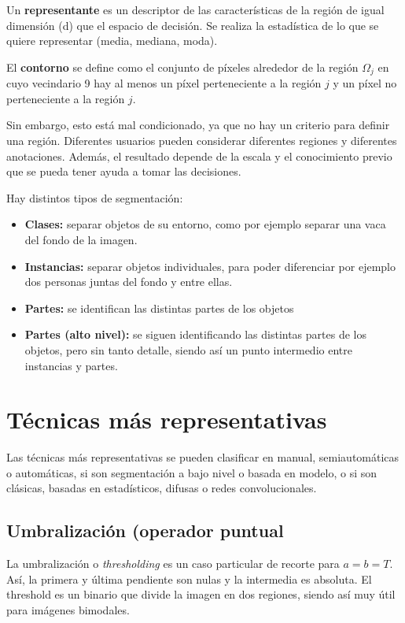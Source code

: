 Un \textbf{representante} es un descriptor de las características de la región de igual dimensión (d) que el espacio de decisión. Se realiza la estadística de lo que se quiere representar (media, mediana, moda). 

El \textbf{contorno} se define como el conjunto de píxeles alrededor de la región $\Omega_j$ en cuyo vecindario 9 hay al menos un píxel perteneciente a la región $j$ y un píxel no perteneciente a la región $j$. 

Sin embargo, esto está mal condicionado, ya que no hay un criterio para definir una región. Diferentes usuarios pueden considerar diferentes regiones y diferentes anotaciones. Además, el resultado depende de la escala y el conocimiento previo que se pueda tener ayuda a tomar las decisiones.

Hay distintos tipos de segmentación:
\begin{itemize}
\item \textbf{Clases:} separar objetos de su entorno, como por ejemplo separar una vaca del fondo de la imagen.
\item \textbf{Instancias:} separar  objetos individuales, para poder diferenciar por ejemplo dos personas juntas del fondo y entre ellas.
\item \textbf{Partes:} se identifican las distintas partes de los objetos
\item \textbf{Partes (alto nivel):} se siguen identificando las distintas partes de los objetos, pero sin tanto detalle, siendo así un punto intermedio entre instancias y partes.
\end{itemize}

\section{Técnicas más representativas}
Las técnicas más representativas se pueden clasificar en manual, semiautomáticas o automáticas, si son segmentación a bajo nivel o basada en modelo, o si son clásicas, basadas en estadísticos, difusas o redes convolucionales.

\subsection{Umbralización (operador puntual}
La umbralización o \textit{thresholding} es un caso particular de recorte para $a = b = T$. Así, la primera y última pendiente son nulas y la intermedia es absoluta. El threshold es un binario que divide la imagen en dos regiones, siendo así muy útil para imágenes bimodales.

